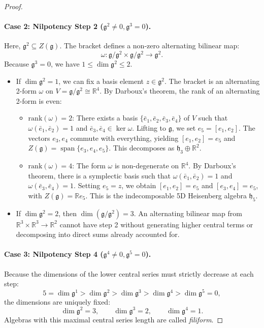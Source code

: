 \documentclass[11pt,a4paper]{article}
\theoremstyle{definition}
\theoremstyle{remark}
\newcommand{\R}{\mathbb{R}}
\newcommand{\g}{\mathfrak{g}}
\newcommand{\hh}{\mathfrak{h}}
\newcommand{\spanop}{\operatorname{span}}
\begin{document}
\begin{proof}
\paragraph{Case 2: Nilpotency Step 2 ($\g^2 \neq 0, \g^3 = 0$).}
Here, $\g^2 \subseteq Z(\g)$. The bracket defines a non-zero alternating bilinear map:
\begin{equation}
    \omega \colon \g/\g^2 \times \g/\g^2 \to \g^2.
\end{equation}
Because $\g^3 = 0$, we have $1 \le \dim \g^2 \le 2$.
\begin{itemize}
    \item If $\dim \g^2 = 1$, we can fix a basis element $z \in \g^2$. The bracket is an alternating 2-form $\omega$ on $V = \g/\g^2 \cong \R^4$. By Darboux's theorem, the rank of an alternating 2-form is even:
    \begin{itemize}
        \item $\mathrm{rank}(\omega) = 2$: There exists a basis $\{\bar{e}_1, \bar{e}_2, \bar{e}_3, \bar{e}_4\}$ of $V$ such that $\omega(\bar{e}_1, \bar{e}_2) = 1$ and $\bar{e}_3, \bar{e}_4 \in \ker \omega$. Lifting to $\g$, we set $e_5 = [e_1, e_2]$. The vectors $e_3, e_4$ commute with everything, yielding $[e_1, e_2] = e_5$ and $Z(\g) = \spanop\{e_3, e_4, e_5\}$. This decomposes as $\hh_3 \oplus \R^2$.
        \item $\mathrm{rank}(\omega) = 4$: The form $\omega$ is non-degenerate on $\R^4$. By Darboux's theorem, there is a symplectic basis such that $\omega(\bar{e}_1, \bar{e}_2) = 1$ and $\omega(\bar{e}_3, \bar{e}_4) = 1$. Setting $e_5 = z$, we obtain $[e_1, e_2] = e_5$ and $[e_3, e_4] = e_5$, with $Z(\g) = \R e_5$. This is the indecomposable 5D Heisenberg algebra $\hh_5$.
    \end{itemize}
    \item If $\dim \g^2 = 2$, then $\dim(\g/\g^2) = 3$. An alternating bilinear map from $\R^3 \times \R^3 \to \R^2$ cannot have step 2 without generating higher central terms or decomposing into direct sums already accounted for.
\end{itemize}

\paragraph{Case 3: Nilpotency Step 4 ($\g^4 \neq 0, \g^5 = 0$).}
Because the dimensions of the lower central series must strictly decrease at each step:
\begin{equation}
    5 = \dim \g^1 > \dim \g^2 > \dim \g^3 > \dim \g^4 > \dim \g^5 = 0,
\end{equation}
the dimensions are uniquely fixed:
\begin{equation}
    \dim \g^2 = 3, \qquad \dim \g^3 = 2, \qquad \dim \g^4 = 1.
\end{equation}
Algebras with this maximal central series length are called \emph{filiform}. 


\end{proof}
\end{document}
